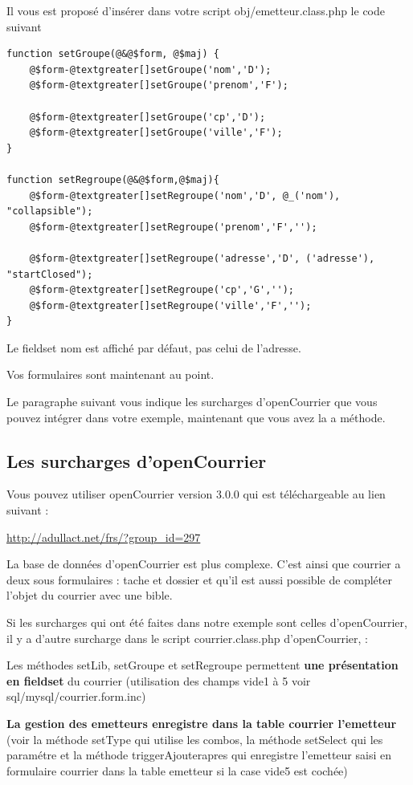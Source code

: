 \documentclass[letterpaper,10pt,french]{manual}
\begin{document}
Il vous est proposé d'insérer dans votre script obj/emetteur.class.php
le code suivant

\begin{Verbatim}[commandchars=@\[\]]
function setGroupe(@&@$form, @$maj) {
    @$form-@textgreater[]setGroupe('nom','D');
    @$form-@textgreater[]setGroupe('prenom','F');

    @$form-@textgreater[]setGroupe('cp','D');
    @$form-@textgreater[]setGroupe('ville','F');
}

function setRegroupe(@&@$form,@$maj){
    @$form-@textgreater[]setRegroupe('nom','D', @_('nom'), "collapsible");
    @$form-@textgreater[]setRegroupe('prenom','F','');

    @$form-@textgreater[]setRegroupe('adresse','D', ('adresse'), "startClosed");
    @$form-@textgreater[]setRegroupe('cp','G','');
    @$form-@textgreater[]setRegroupe('ville','F','');
}
\end{Verbatim}

Le fieldset nom est affiché par défaut, pas celui de l'adresse.

Vos formulaires sont maintenant au point.

Le paragraphe suivant vous indique les surcharges d'openCourrier que vous
pouvez intégrer dans votre exemple, maintenant que vous avez la a méthode.


\subsection{Les surcharges d'openCourrier}

Vous pouvez utiliser openCourrier version 3.0.0 qui est téléchargeable au lien suivant :

\href{http://adullact.net/frs/?group\_id=297}{http://adullact.net/frs/?group\_id=297}

La base de données d'openCourrier est plus complexe. C'est ainsi que
courrier a deux sous formulaires : tache et dossier et qu'il
est aussi possible de compléter l'objet du courrier avec une bible.

Si les surcharges qui ont été faites dans notre exemple sont celles d'openCourrier, il y a
d'autre surcharge dans le script courrier.class.php d'openCourrier,  :

Les méthodes setLib, setGroupe et setRegroupe permettent \textbf{une présentation
en fieldset}  du courrier (utilisation des champs vide1 à 5 voir sql/mysql/courrier.form.inc)

\textbf{La gestion des emetteurs enregistre dans la table courrier l'emetteur} (voir la méthode
setType qui utilise les combos, la méthode setSelect qui les paramétre
et la méthode triggerAjouterapres qui enregistre l'emetteur saisi en formulaire courrier
dans la table emetteur si la case vide5 est cochée)
\end{document}
